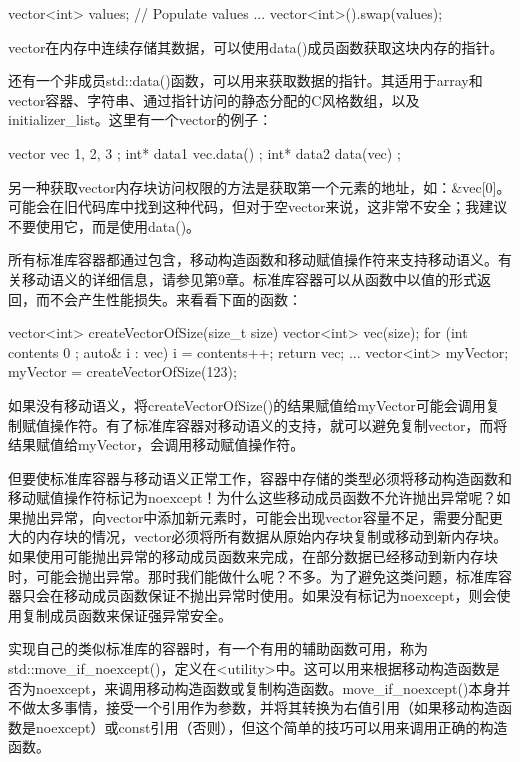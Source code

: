 \begin{cpp}
vector<int> values;
// Populate values ...
vector<int>().swap(values);
\end{cpp}


vector在内存中连续存储其数据，可以使用data()成员函数获取这块内存的指针。

还有一个非成员std::data()函数，可以用来获取数据的指针。其适用于array和vector容器、字符串、通过指针访问的静态分配的C风格数组，以及initializer\_list。这里有一个vector的例子：

\begin{cpp}
vector vec { 1, 2, 3 };
int* data1 { vec.data() };
int* data2 { data(vec) };
\end{cpp}

另一种获取vector内存块访问权限的方法是获取第一个元素的地址，如：\&vec[0]。可能会在旧代码库中找到这种代码，但对于空vector来说，这非常不安全；我建议不要使用它，而是使用data()。


所有标准库容器都通过包含，移动构造函数和移动赋值操作符来支持移动语义。有关移动语义的详细信息，请参见第9章。标准库容器可以从函数中以值的形式返回，而不会产生性能损失。来看看下面的函数：

\begin{cpp}
vector<int> createVectorOfSize(size_t size)
{
    vector<int> vec(size);
    for (int contents { 0 }; auto& i : vec) { i = contents++; }
    return vec;
}
...
vector<int> myVector;
myVector = createVectorOfSize(123);
\end{cpp}

如果没有移动语义，将createVectorOfSize()的结果赋值给myVector可能会调用复制赋值操作符。有了标准库容器对移动语义的支持，就可以避免复制vector，而将结果赋值给myVector，会调用移动赋值操作符。

但要使标准库容器与移动语义正常工作，容器中存储的类型必须将移动构造函数和移动赋值操作符标记为noexcept！为什么这些移动成员函数不允许抛出异常呢？如果抛出异常，向vector中添加新元素时，可能会出现vector容量不足，需要分配更大的内存块的情况，vector必须将所有数据从原始内存块复制或移动到新内存块。如果使用可能抛出异常的移动成员函数来完成，在部分数据已经移动到新内存块时，可能会抛出异常。那时我们能做什么呢？不多。为了避免这类问题，标准库容器只会在移动成员函数保证不抛出异常时使用。如果没有标记为noexcept，则会使用复制成员函数来保证强异常安全。

实现自己的类似标准库的容器时，有一个有用的辅助函数可用，称为std::move\_if\_noexcept()，定义在<utility>中。这可以用来根据移动构造函数是否为noexcept，来调用移动构造函数或复制构造函数。move\_if\_noexcept()本身并不做太多事情，接受一个引用作为参数，并将其转换为右值引用（如果移动构造函数是noexcept）或const引用（否则），但这个简单的技巧可以用来调用正确的构造函数。

